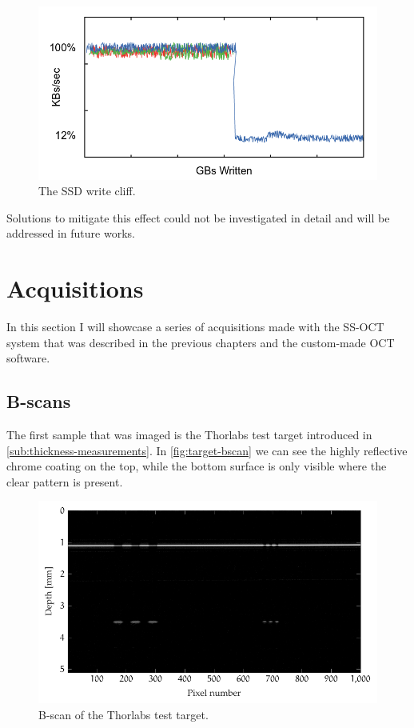 \begin{figure}[htb]
	\myfloatalign
	\includegraphics[width=0.8\linewidth]{gfx/ch4/write-cliff}
	\caption{The SSD write cliff.}\label{fig:write-cliff}
\end{figure}

Solutions to mitigate this effect could not be investigated in detail and will be addressed in future works. 

\clearpage
\section{Acquisitions}
In this section I will showcase a series of acquisitions made with the SS-OCT system that was described in the previous chapters and the custom-made OCT software.
\subsection{B-scans}
The first sample that was imaged is the Thorlabs test target introduced in \autoref{sub:thickness-measurements}. In \autoref{fig:target-bscan} we can see the highly reflective chrome coating on the top, while the bottom surface is only visible where the clear pattern is present.
\begin{figure}[hbt]
	\centering
	\includegraphics[width=0.8\linewidth]{gfx/ch4/axsun/target-bscan}
	\caption{B-scan of the Thorlabs test target.}\label{fig:target-bscan}
\end{figure}%


